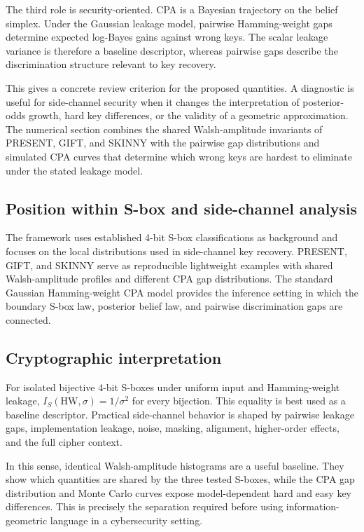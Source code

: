 \documentclass[referee,lineno,pdflatex,sn-mathphys-num]{sn-jnl}
\theoremstyle{thmstylethree}
\theoremstyle{thmstyletwo}
\theoremstyle{thmstyleone}
\newcommand{\HW}{\mathrm{HW}}
\begin{document}
The third role is security-oriented.  CPA is a Bayesian trajectory on the
belief simplex.  Under the Gaussian leakage model, pairwise Hamming-weight gaps
determine expected log-Bayes gains against wrong keys.  The scalar leakage
variance is therefore a baseline descriptor, whereas pairwise gaps describe
the discrimination structure relevant to key recovery.

This gives a concrete review criterion for the proposed quantities.  A
diagnostic is useful for side-channel security when it changes the
interpretation of posterior-odds growth, hard key differences, or the validity
of a geometric approximation.  The numerical section combines the shared
Walsh-amplitude invariants of PRESENT, GIFT, and SKINNY with the pairwise gap
distributions and simulated CPA curves that determine which wrong keys are
hardest to eliminate under the stated leakage model.

\subsection{Position within S-box and side-channel analysis}

The framework uses established 4-bit S-box classifications as background and
focuses on the local distributions used in side-channel key recovery.  PRESENT,
GIFT, and SKINNY serve as reproducible lightweight examples with shared
Walsh-amplitude profiles and different CPA gap distributions.  The standard
Gaussian Hamming-weight CPA model provides the inference setting in which the
boundary S-box law, posterior belief law, and pairwise discrimination gaps are
connected.

\subsection{Cryptographic interpretation}

For isolated bijective 4-bit S-boxes under uniform input and Hamming-weight
leakage, $I_S(\HW,\sigma)=1/\sigma^2$ for every bijection.  This equality is
best used as a baseline descriptor.  Practical side-channel behavior is shaped
by pairwise leakage gaps, implementation leakage, noise, masking, alignment,
higher-order effects, and the full cipher context.

In this sense, identical Walsh-amplitude histograms are a useful baseline.
They show which quantities are shared by the three tested S-boxes, while the
CPA gap distribution and Monte Carlo curves expose model-dependent hard and
easy key differences.  This is precisely the separation required before using
information-geometric language in a cybersecurity setting.
\end{document}
